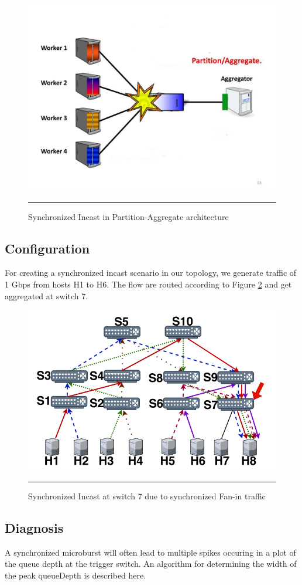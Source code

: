 \begin{figure}[htbp]
	\centering
		\includegraphics[width=0.65\columnwidth]{Figures/sync_incast.jpg}
		\rule{35em}{0.5pt}
	\caption[Synchronized Incast]{Synchronized Incast in Partition-Aggregate architecture}
	\label{fig:Synch Incast}
\end{figure}

\subsection{Configuration}
For creating a synchronized incast scenario in our topology, we generate traffic of 1 Gbps from hosts H1 to H6. The flow are routed
according to Figure \ref{fig:Synch Incast Topo} and get aggregated at switch 7.
\begin{figure}[htbp]
	\centering
		\includegraphics[width=0.65\columnwidth]{Figures/sync_incast_topo.png}
		\rule{35em}{0.5pt}
	\caption[Synchronized Incast Flows]{Synchronized Incast at switch 7 due to synchronized Fan-in traffic}
	\label{fig:Synch Incast Topo}
\end{figure}


\subsection{Diagnosis}
A synchronized microburst will often lead to multiple spikes occuring in a plot 
of the queue depth at the trigger switch. An algorithm for determining the width of
the peak queueDepth is described here.

